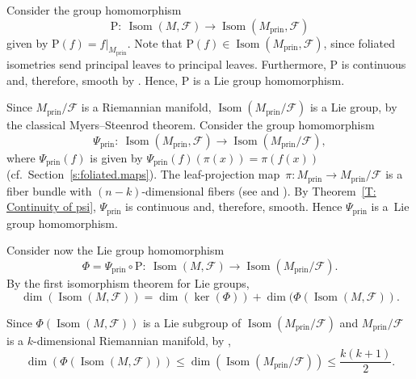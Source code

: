 \documentclass[pdftex]{sigma}
\numberwithin{equation}{section}
\theoremstyle{definition}
\DeclareMathOperator{\Iso}{Isom}
\newcommand{\prin}{\mathrm{prin}}
\newcommand{\fol}{\mathcal{F}}
\newcommand{\Rho}{\mathrm{P}}
\begin{document}
Consider the group homomorphism
\[
\Rho\colon \ \Iso(M,\fol)\to \Iso(M_{\prin},\fol)
\]
given by $\Rho(f) = f|_{M_{\prin}}$.
Note that $\Rho(f)\in \Iso(M_\prin,\fol)$, since foliated isometries send principal leaves to principal leaves.
Furthermore, $\Rho$ is continuous and, therefore, smooth by \cite[Corollary~3.50]{Hall2015}. Hence, $\Rho$ is a Lie group homomorphism.

Since $M_\prin/\fol$ is a Riemannian manifold, $\Iso(M_\prin/\fol)$ is a Lie group, by the classical Myers--Steenrod theorem.
Consider the group homomorphism
\[
\Psi_\prin\colon \ \Iso (M_\prin,\fol)\to\Iso (M_\prin/\fol),
\]
where $\Psi_\prin(f)$ is given by
$\Psi_\prin(f)(\pi(x)) = \pi(f(x))$ (cf.\ Section~\ref{s:foliated.maps}). The leaf-projection map~${\pi\colon M_{\prin}\to M_{\prin}/\fol}$ is a fiber bundle with $(n-k)$-dimensional fibers (see \cite[Theorem~A]{MendesRadeschi2019} and \cite[p.~41]{Corro}).
By Theorem~\ref{T: Continuity of psi}, $\Psi_\prin$ is continuous and, therefore, smooth. Hence $\Psi_\prin$ is a~Lie group homomorphism.

Consider now the Lie group homomorphism
\[
\Phi = \Psi_\prin\circ \Rho \colon \ \Iso(M,\fol) \to \Iso(M_\prin/\fol).
\]
By the first isomorphism theorem for Lie groups,
\begin{equation}
\label{eq:rank.nullity.Phi}
\dim(\Iso(M,\fol)) = \dim(\ker(\Phi)) + \dim(\Phi(\Iso(M,\fol)).
\end{equation}

Since $\Phi(\Iso(M,\fol))$ is a Lie subgroup of $\Iso(M_\prin/\fol)$ and $M_\prin/\fol$ is a $k$-dimensional Riemannian manifold, by \cite[Chapter~II, Theorem~3.1]{Kobayashi},
\begin{equation}
\label{eq:bound.dim.im.phi}
\dim(\Phi(\Iso(M,\fol)))\leq \dim(\Iso(M_\prin/\fol)) \leq \frac{k(k+1)}{2}.
\end{equation}
\end{document}
